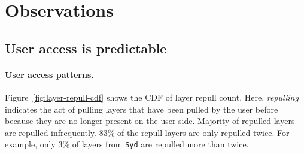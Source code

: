 \section{Observations}
\label{sec:dataset-analysis}

%
%

%




\subsection{User access is predictable}


\paragraph{User access patterns.} 
Figure~\ref{fig:layer-repull-cdf} shows the CDF of layer repull count. Here, \emph{repulling} indicates the act of pulling layers that have been pulled by the user before because they are no longer present on the user side.
Majority of repulled layers are repulled infrequently.
83\% of the repull layers are only repulled twice.
For example, only 3\% of layers from \texttt{Syd} are repulled more than twice.

